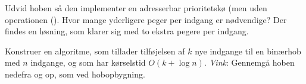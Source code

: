 \begin{exerc} 
Udvid hoben så den implementer en adresserbar prioritetskø (men uden operationen (). 
Hvor mange yderligere peger per indgang er nødvendige?
Der findes en løsning, som klarer sig med to ekstra pegere per indgang.
\end{exerc}

\begin{exerc}[Massetilføjelse]
Konstruer en algoritme, som tillader tilføjelsen af $k$ nye indgange til en binærhob med $n$ indgange, og som har kørselstid $O(k+\log n)$.
\emph{Vink}: Gennemgå hoben nedefra og op, som ved hobopbygning.
\end{exerc}

